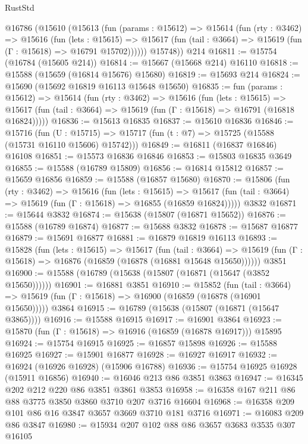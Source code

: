 \begin{lexlean}{RustStd}
\begin{coremodule}
    @16786
      (@15610
        (@15613
          (fun (params : @15612) =>
          @15614
            (fun (rty : @3462) =>
            @15616
              (fun (lets : @15615) =>
              @15617 (fun (tail : @3664) => @15619 (fun (Γ : @15618) => @16791 @15702))))))
        @15748))
    @214
@16811 := @15754 (@16784 (@15605 @214))
@16814 := @15667 (@15668 @214) @16110
@16818 := @15588 (@15659 (@16814 @15676) @15680)
@16819 := @15693 @214
@16824 := @15690 (@15692 @16819 @16113 @15648 @15650)
@16835 := fun (params : @15612) =>
  @15614
    (fun (rty : @3462) =>
    @15616
      (fun (lets : @15615) =>
      @15617 (fun (tail : @3664) => @15619 (fun (Γ : @15618) => @16791 (@16818 @16824)))))
@16836 := @15613 @16835
@16837 := @15610 @16836
@16846 := @15716
    (fun (U : @15715) => @15717 (fun (t : @7) => @15725 (@15588 (@15731 @16110 @15606) @15742)))
@16849 := @16811 (@16837 @16846) @16108
@16851 := @15573 @16836 @16846
@16853 := @15803 @16835 @3649
@16855 := @15588 (@16789 @15809)
@16856 := @16814 @15812
@16857 := @15659 @16856
@16859 := @15588 (@16857 @15680)
@16870 := @15806
    (fun (rty : @3462) =>
    @15616
      (fun (lets : @15615) =>
      @15617 (fun (tail : @3664) => @15619 (fun (Γ : @15618) => @16855 (@16859 @16824)))))
    @3832
@16871 := @15644 @3832
@16874 := @15638 (@15807 (@16871 @15652))
@16876 := @15588 (@16789 @16874)
@16877 := @15688 @3832
@16878 := @15687 @16877
@16879 := @15691 @16877
@16881 := @16879 @16819 @16113
@16893 := @15828
    (fun (lets : @15615) =>
    @15617
      (fun (tail : @3664) =>
      @15619 (fun (Γ : @15618) => @16876 (@16859 (@16878 (@16881 @15648 @15650))))))
    @3851
@16900 := @15588 (@16789 (@15638 (@15807 (@16871 (@15647 (@3852 @15650))))))
@16901 := @16881 @3851
@16910 := @15852
    (fun (tail : @3664) => @15619 (fun (Γ : @15618) => @16900 (@16859 (@16878 (@16901 @15650)))))
    @3864
@16915 := @16789 (@15638 (@15807 (@16871 (@15647 @3865))))
@16916 := @15588 @16915
@16917 := @16901 @3864
@16923 := @15870 (fun (Γ : @15618) => @16916 (@16859 (@16878 @16917))) @15895
@16924 := @15754 @16915
@16925 := @16857 @15898
@16926 := @15588 @16925
@16927 := @15901 @16877
@16928 := @16927 @16917
@16932 := @16924 (@16926 @16928) (@15906 @16788)
@16936 := @15754 @16925 @16928 (@15911 @16856)
@16940 := @16046 @213 @86 @3851 @3863
@16947 := @16345 @202 @212 @220 @86 @3851 @3861 @3853
@16958 := @16358 @167 @211 @86 @88 @3775 @3850 @3860 @3710 @207 @3716 @16604
@16968 := @16358 @209 @101 @86 @16 @3847 @3657 @3669 @3710 @181 @3716
@16971 := @16083 @209 @86 @3847
@16980 := @15934 @207 @102 @88 @86 @3657 @3683 @3535 @307 @16105

\end{coremodule}
\end{lexlean}
